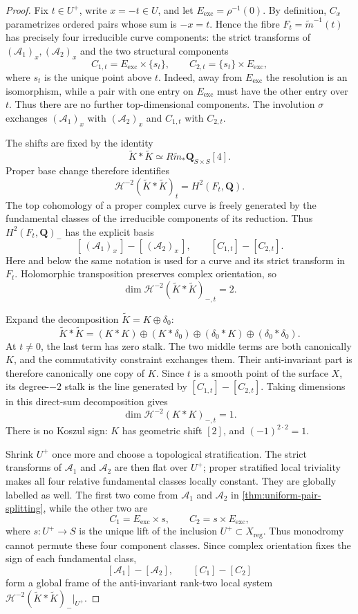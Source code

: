 \documentclass[10pt]{amsart}
\numberwithin{equation}{section}
\theoremstyle{definition}
\theoremstyle{remark}
\newcommand{\QQ}{\mathbf Q}
\newcommand{\reg}{\mathrm{reg}}
\newcommand{\exc}{\mathrm{exc}}
\newcommand{\cH}{\mathcal H}
\newcommand{\cA}{\mathcal A}
\newcommand{\wt}{\widetilde}
\begin{document}
\begin{proof}
Fix $t\in U^+$, write $x=-t\in U$, and let
$E_{\exc}=\rho^{-1}(0)$.  By definition, $C_x$ parametrizes ordered pairs
whose sum is $-x=t$.  Hence the fibre
$F_t=\wt m^{-1}(t)$ has precisely four irreducible curve components: the
strict transforms of $(\cA_1)_x,(\cA_2)_x$ and the two structural components
\[
 C_{1,t}=E_{\exc}\times\{s_t\},
 \qquad
 C_{2,t}=\{s_t\}\times E_{\exc},
\]
where $s_t$ is the unique point above $t$.  Indeed, away from
$E_{\exc}$ the resolution is an isomorphism, while a pair with one entry on
$E_{\exc}$ must have the other entry over $t$.  Thus there are no further
top-dimensional components.  The involution $\sigma$ exchanges
$(\cA_1)_x$ with $(\cA_2)_x$ and $C_{1,t}$ with $C_{2,t}$.

The shifts are fixed by the identity
\[
 \widetilde K*\widetilde K
 \simeq R\widetilde m_*\QQ_{S\times S}[4].
\]
Proper base change therefore identifies
\[
 \cH^{-2}(\widetilde K*\widetilde K)_t=H^2(F_t,\QQ).
\]
The top cohomology of a proper complex curve is freely generated by the
fundamental classes of the irreducible components of its reduction.  Thus
$H^2(F_t,\QQ)_-$ has the explicit basis
\[
 [\,(\cA_1)_x\,]-[\,(\cA_2)_x\,],
 \qquad [C_{1,t}]-[C_{2,t}].
\]
Here and below the same notation is used for a curve and its strict transform
in $F_t$.  Holomorphic transposition preserves complex orientation, so
\begin{equation}
 \dim\cH^{-2}(\widetilde K*\widetilde K)_{-,t}=2.
\label{eq:total-alt-rank}
\end{equation}

Expand the decomposition $\widetilde K=K\oplus\delta_0$:
\[
 \widetilde K*\widetilde K=(K*K)\oplus(K*\delta_0)\oplus(\delta_0*K)
      \oplus(\delta_0*\delta_0).
\]
At $t\ne0$, the last term has zero stalk.  The two middle terms are both
canonically $K$, and the commutativity constraint exchanges them.  Their
anti-invariant part is therefore canonically one copy of $K$.  Since $t$ is
a smooth point of the surface $X$, its degree-$-2$ stalk is the line
generated by $[C_{1,t}]-[C_{2,t}]$.  Taking dimensions in this direct-sum
decomposition gives
\begin{equation}
 \dim\cH^{-2}(K*K)_{-,t}=1.
\label{eq:principal-alt-rank}
\end{equation}
There is no Koszul sign: $K$ has geometric shift $[2]$, and
$(-1)^{2\cdot2}=1$.

Shrink $U^+$ once more and choose a topological stratification.  The strict
transforms of $\cA_1$ and $\cA_2$ are then flat over $U^+$; proper
stratified local triviality makes all four relative fundamental classes
locally constant.  They are globally labelled as well.  The first two come
from $\cA_1$ and $\cA_2$ in \cref{thm:uniform-pair-splitting}, while the
other two are
\[
 C_1=E_{\exc}\times s,\qquad C_2=s\times E_{\exc},
\]
where $s:U^+\to S$ is the unique lift of the inclusion $U^+\subset X_{\reg}$.
Thus monodromy cannot permute these four component classes.  Since complex
orientation fixes the sign of each fundamental class,
\[
 [\cA_1]-[\cA_2],\qquad [C_1]-[C_2]
\]
form a global frame of the anti-invariant rank-two local system
$\cH^{-2}(\widetilde K*\widetilde K)_-|_{U^+}$.


\end{proof}
\end{document}

